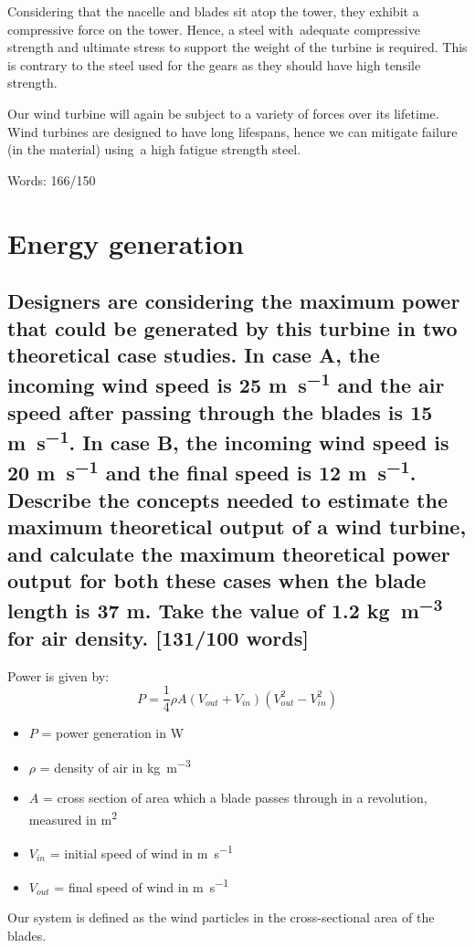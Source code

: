 \documentclass[12pt]{article}
\numberwithin{equation}{section}
\begin{document}
\begin{flushleft}
Considering that the nacelle and blades sit atop the tower, they exhibit a compressive force on the tower. Hence, a steel with adequate compressive strength and ultimate stress to support the weight of the turbine is required. This is contrary to the steel used for the gears as they should have high tensile strength. 

Our wind turbine will again be subject to a variety of forces over its lifetime. Wind turbines are designed to have long lifespans, hence we can mitigate failure (in the material) using a high fatigue strength steel.

Words: 166/150

\section{Energy generation}
\subsection[Maximum power generation.]{Designers are considering the maximum power that could be generated by this turbine in two theoretical case studies. In case A, the incoming wind speed is 25 \si{\meter\per\second} and the air speed after passing through the blades is 15 \si{\meter\per\second}. In case B, the incoming wind speed is 20 \si{\meter\per\second} and the final speed is 12 \si{\meter\per\second}. Describe the concepts needed to estimate the maximum theoretical output of a wind turbine, and calculate the maximum theoretical power output for both these cases when the blade length is 37 \si{\meter}. Take the value of 1.2 \si{\kg\per\meter\cubed} for air density. [131/100 words]}
Power is given by:
\begin{equation}
  P = \frac{1}{4} \rho A (V_{out} + V_{in})(V_{out}^2 - V_{in}^2)
\end{equation}
\begin{itemize}
  \item $P$ = power generation in \si{\watt}
  \item $\rho$ = density of air in \si{\kg\per\meter\cubed}
  \item $A$ = cross section of area which a blade passes through in a revolution, measured in \si{\meter\squared}
  \item $V_{in}$ = initial speed of wind in \si{\meter\per\second}
  \item $V_{out}$ = final speed of wind in \si{\meter\per\second}
\end{itemize}
Our system is defined as the wind particles in the cross-sectional area of the blades.

\end{flushleft}
\end{document}
